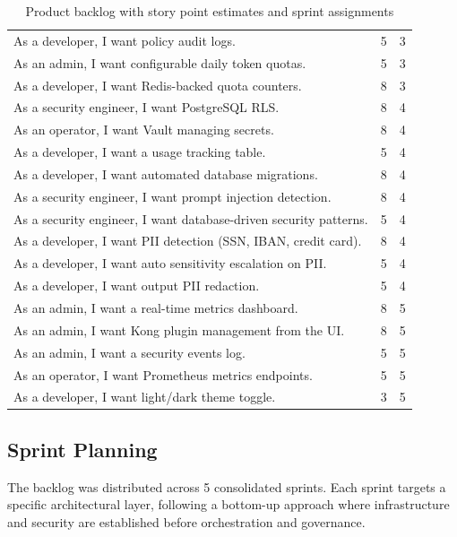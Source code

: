 \begin{table}[H]
\begin{tabularx}{\textwidth}{| >{\raggedright\arraybackslash}X | c | c |}
As a developer, I want policy audit logs. & 5 & 3 \\
As an admin, I want configurable daily token quotas. & 5 & 3 \\
As a developer, I want Redis-backed quota counters. & 8 & 3 \\
\hline
As a security engineer, I want PostgreSQL RLS. & 8 & 4 \\
As an operator, I want Vault managing secrets. & 8 & 4 \\
As a developer, I want a usage tracking table. & 5 & 4 \\
As a developer, I want automated database migrations. & 8 & 4 \\
As a security engineer, I want prompt injection detection. & 8 & 4 \\
As a security engineer, I want database-driven security patterns. & 5 & 4 \\
As a developer, I want PII detection (SSN, IBAN, credit card). & 8 & 4 \\
As a developer, I want auto sensitivity escalation on PII. & 5 & 4 \\
As a developer, I want output PII redaction. & 5 & 4 \\
\hline
As an admin, I want a real-time metrics dashboard. & 8 & 5 \\
As an admin, I want Kong plugin management from the UI. & 8 & 5 \\
As an admin, I want a security events log. & 5 & 5 \\
As an operator, I want Prometheus metrics endpoints. & 5 & 5 \\
As a developer, I want light/dark theme toggle. & 3 & 5 \\
\hline
\end{tabularx}
\caption{Product backlog with story point estimates and sprint assignments}
\label{tab:backlog}
\end{table}


\subsection{Sprint Planning}

The backlog was distributed across 5 consolidated sprints. Each sprint targets a specific architectural layer, following a bottom-up approach where infrastructure and security are established before orchestration and governance.


